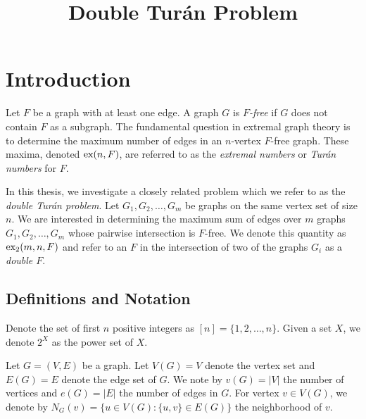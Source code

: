 \documentclass[12pt]{report}
\title{Double Turán Problem}
\newcommand*{\ex}{\textnormal{ex}}
\newcommand*{\dex}{\textnormal{ex}_2}
\begin{document}
\maketitle



\tableofcontents

\chapter{Introduction}

Let $F$ be a graph with at least one edge. A graph $G$ is \textit{$F$-free} if $G$ does not contain $F$ as a subgraph. The fundamental question in extremal graph theory is to determine the maximum number of edges in an $n$-vertex $F$-free graph. These maxima, denoted $\ex(n, F)$, are referred to as the \textit{extremal numbers} or \textit{Turán numbers} for $F$.

In this thesis, we investigate a closely related problem which we refer to as the \textit{double Turán problem}. Let $G_1, G_2, \ldots, G_m$ be graphs on the same vertex set of size $n$. We are interested in determining the maximum sum of edges over $m$ graphs $G_1, G_2, \ldots, G_m$ whose pairwise intersection is $F$-free. We denote this quantity as $\dex(m, n, F)$ and refer to an $F$ in the intersection of two of the graphs $G_i$ as a \textit{double $F$}. 

\section{Definitions and Notation}

Denote the set of first $n$ positive integers as $[n] = \{1, 2, \ldots, n\}$. Given a set $X$, we denote $2^X$ as the power set of $X$.

Let $G = (V, E)$ be a graph. Let $V(G) = V$ denote the vertex set and $E(G) = E$ denote the edge set of $G$. We note by $v(G) = |V|$ the number of vertices and $e(G) = |E|$ the number of edges in $G$. For vertex $v \in V(G)$, we denote by $N_G(v) = \{u \in V(G) : \{u, v\} \in E(G)\}$ the neighborhood of $v$.
\end{document}
